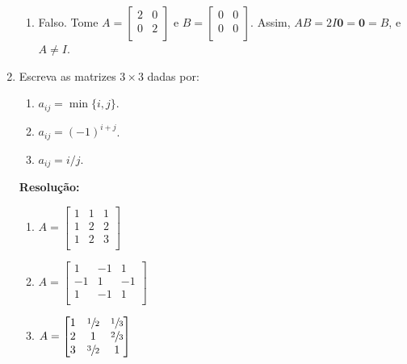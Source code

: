 \documentclass[leqno]{article}
\begin{document}
\begin{enumerate}
\begin{enumerate}
        \item Falso. Tome $A=\begin{bmatrix}
        2 & 0\\
        0 & 2\\
        \end{bmatrix}$ e $B=\begin{bmatrix}
        0 & 0\\
        0 & 0\\
        \end{bmatrix}$. Assim, $AB=2I\textbf{0}=\textbf{0}= B$, e $A\neq I$.
    \end{enumerate}
    
    \item Escreva as matrizes $3\times3$ dadas por:
    
    \begin{enumerate}
        \item $a_{ij}=\min\{i,j\}$.
        \item $a_{ij}=(-1)^{i+j}$.
        \item $a_{ij}=i/j$.
    \end{enumerate}
    
    \textbf{Resolução:}
    
    \begin{enumerate}
        \item $A=\begin{bmatrix}
        1 & 1 & 1\\
        1 & 2 & 2\\
        1 & 2 & 3\\
        \end{bmatrix}$
        
        \item $A=\begin{bmatrix}
        1 & -1 & 1\\
        -1 & 1 & -1\\
        1 & -1 & 1\\
        \end{bmatrix}$
        
        \item $A=\begin{bmatrix}
        1 & \sfrac{1}{2} & \sfrac{1}{3}\\
        2 & 1 & \sfrac{2}{3}\\
        3 & \sfrac{3}{2} & 1\\
        \end{bmatrix}$
    \end{enumerate}
    

\end{enumerate}
\end{document}

